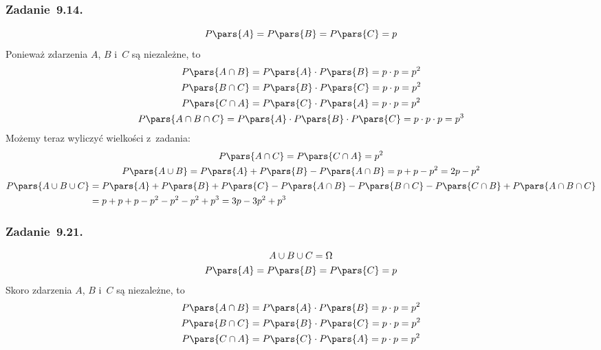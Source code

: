 \subsubsection*{Zadanie~9.14.}
\begin{equation*}
    P\pars{A} = P\pars{B} = P\pars{C} = p
\end{equation*}
Ponieważ zdarzenia \(A\), \(B\) i~\(C\) są niezależne, to
\begin{gather*}
    P\pars{A \cap B} = P\pars{A} \cdot P\pars{B} = p \cdot p = p^2\\
    P\pars{B \cap C} = P\pars{B} \cdot P\pars{C} = p \cdot p = p^2\\
    P\pars{C \cap A} = P\pars{C} \cdot P\pars{A} = p \cdot p = p^2\\
    P\pars{A \cap B \cap C} = P\pars{A} \cdot P\pars{B} \cdot P\pars{C} = p \cdot p \cdot p = p^3
\end{gather*}
Możemy teraz wyliczyć wielkości z~zadania:
\begin{gather*}
    P\pars{A \cap C} = P\pars{C \cap A} = p^2\\
    P\pars{A \cup B} = P\pars{A} + P\pars{B} - P\pars{A \cap B}
        = p + p - p^2
        = 2p - p^2\\
    \begin{split}
        P\pars{A \cup B \cup C} &= P\pars{A} + P\pars{B} + P\pars{C} - P\pars{A \cap B} - P\pars{B \cap C} - P\pars{C \cap B} + P\pars{A \cap B \cap C}\\
            &= p + p + p - p^2 - p^2 - p^2 + p^3
            = 3p - 3p^2 + p^3
    \end{split}
\end{gather*}
\subsubsection*{Zadanie~9.21.}
\begin{gather*}
    A \cup B \cup C = \Omega\\
    P\pars{A} = P\pars{B} = P\pars{C} = p
\end{gather*}
Skoro zdarzenia \(A\), \(B\) i~\(C\) są niezależne, to
\begin{gather*}
    P\pars{A \cap B} = P\pars{A} \cdot P\pars{B}
        = p \cdot p
        = p^2\\
    P\pars{B \cap C} = P\pars{B} \cdot P\pars{C}
        = p \cdot p
        = p^2\\
    P\pars{C \cap A} = P\pars{C} \cdot P\pars{A}
        = p \cdot p
        = p^2
\end{gather*}
